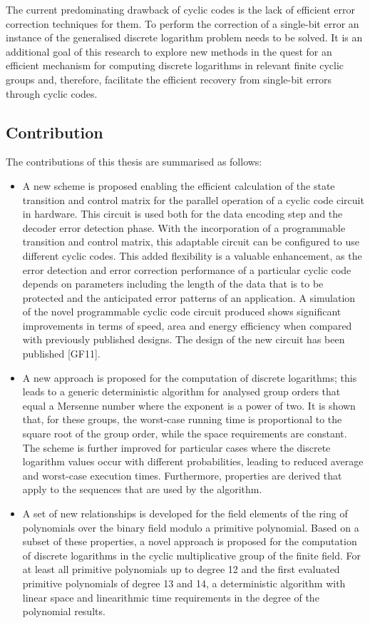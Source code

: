 \documentclass[a4paper, 11pt]{article}
\begin{document}
The current predominating drawback of cyclic codes is the lack of efficient error correction techniques for them. To perform the correction of a single-bit error an instance of the generalised discrete logarithm problem needs to be solved. It is an additional goal of this research to explore new methods in the quest for an efficient mechanism for computing discrete logarithms in relevant finite cyclic groups and, therefore, facilitate the efficient recovery from single-bit errors through cyclic codes.

\subsection{Contribution}
The contributions of this thesis are summarised as follows:

\begin{itemize}
\item A new scheme is proposed enabling the efficient calculation of the state transition and control matrix for the parallel operation of a cyclic code circuit in hardware. This circuit is used both for the data encoding step and the decoder error detection phase. With the incorporation of a programmable transition and control matrix, this adaptable circuit can be configured to use different cyclic codes. This added flexibility is a valuable enhancement, as the error detection and error correction performance of a particular cyclic code depends on parameters including the length of the data that is to be protected and the anticipated error patterns of an application. A simulation of the novel programmable cyclic code circuit produced shows significant improvements in terms of speed, area and energy efficiency when compared with previously published designs. The design of the new circuit has been published [GF11].
\item A new approach is proposed for the computation of discrete logarithms; this leads to a generic deterministic algorithm for analysed group orders that equal a Mersenne number where the exponent is a power of two. It is shown that, for these groups, the worst-case running time is proportional to the square root of the group order, while the space requirements are constant. The scheme is further improved for particular cases where the discrete logarithm values occur with different probabilities, leading to reduced average and worst-case execution times. Furthermore, properties are derived that apply to the sequences that are used by the algorithm.
\item A set of new relationships is developed for the field elements of the ring of polynomials over the binary field modulo a primitive polynomial. Based on a subset of these properties, a novel approach is proposed for the computation of discrete logarithms in the cyclic multiplicative group of the finite field. For at least all primitive polynomials up to degree 12 and the first evaluated primitive polynomials of degree 13 and 14, a deterministic algorithm with linear space and linearithmic time requirements in the degree of the polynomial results.
\end{itemize}
\end{document}
